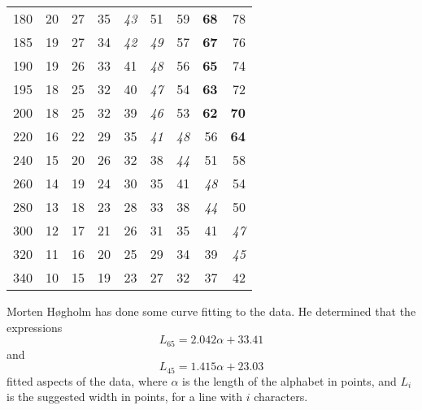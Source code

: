 \documentclass[11pt,twocolumn]{drd-article}
\begin{document}
\begin{table}
\begin{tabular}{r|rrrrrrrr}
180  & 20 & 27 & 35 & \textit{43} & 51 & 59 & \textbf{68} & 78 \\
185  & 19 & 27 & 34 & \textit{42} & \textit{49} & 57 & \textbf{67} & 76 \\
190  & 19 & 26 & 33 & 41 & \textit{48} & 56 & \textbf{65} & 74 \\
195  & 18 & 25 & 32 & 40 & \textit{47} & 54 & \textbf{63} & 72 \\
200  & 18 & 25 & 32 & 39 & \textit{46} & 53 & \textbf{62} & \textbf{70} \\ 
220  & 16 & 22 & 29 & 35 & \textit{41} & \textit{48} & 56 & \textbf{64} \\
240  & 15 & 20 & 26 & 32 & 38 & \textit{44} & 51 & 58 \\
260  & 14 & 19 & 24 & 30 & 35 & 41 & \textit{48} & 54 \\
280  & 13 & 18 & 23 & 28 & 33 & 38 & \textit{44} & 50 \\
300  & 12 & 17 & 21 & 26 & 31 & 35 & 41 & \textit{47} \\
320  & 11 & 16 & 20 & 25 & 29 & 34 & 39 & \textit{45} \\
340  & 10 & 15 & 19 & 23 & 27 & 32 & 37 & 42 \\
\hline
\end{tabular}

\end{table}

Morten H{\o}gholm has done some curve fitting to the data. He determined that the expressions
\begin{equation}
L_{65} = 2.042\alpha + 33.41 \label{eq:L65}
\end{equation}
and
\begin{equation}
L_{45} = 1.415\alpha + 23.03 \label{eq:L45}
\end{equation}
fitted aspects of the data, where $\alpha$ is the length of the alphabet
in points, and $L_{i}$ is the suggested width in points, for a line with
$i$ characters.
\end{document}
